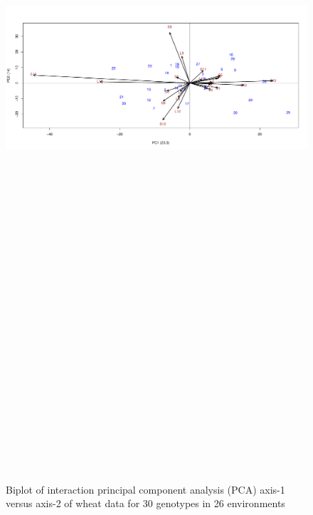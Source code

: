\begin{figure} [h!]
	\centering  
	\scalebox{0.40}
	{\includegraphics[width=14in,height=12in]{02ThesisMain/Ch04RD/figures/k.pdf}}
	\caption[Biplot of IPCA axis-1 versus Axis-2]{ Biplot of interaction principal component analysis (PCA) axis-1 versus axis-2 of wheat data for 30 genotypes in 26 environments  }
	\label{Figure:4.1 }
\end{figure}
